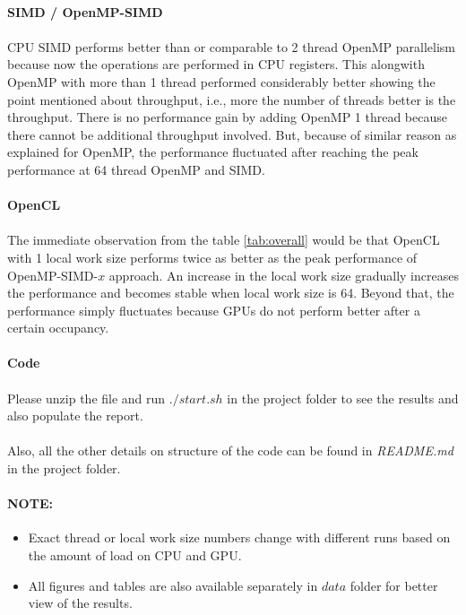 \documentclass[notitlepage]{report}
\begin{document}
	\newpage
	
	\paragraph{SIMD / OpenMP-SIMD}
	\paragraph{} CPU SIMD performs better than or comparable to 2 thread OpenMP parallelism because now the operations are performed in CPU registers. This alongwith OpenMP with more than 1 thread performed considerably better showing the point mentioned about throughput, i.e., more the number of threads better is the throughput. There is no performance gain by adding OpenMP 1 thread because there cannot be additional throughput involved. But, because of similar reason as explained for OpenMP, the performance fluctuated after reaching the peak performance at 64 thread OpenMP and SIMD.
	
	\paragraph{OpenCL}
	\paragraph{} The immediate observation from the table \ref{tab:overall} would be that OpenCL with 1 local work size performs twice as better as the peak performance of OpenMP-SIMD-$x$ approach. An increase in the local work size gradually increases the performance and becomes stable when local work size is 64. Beyond that, the performance simply fluctuates because GPUs do not perform better after a certain occupancy.
	
	\paragraph{Code}
	\paragraph{} Please unzip the file and run $./start.sh$ in the project folder to see the results and also populate the report.
	\paragraph{} Also, all the other details on structure of the code can be found in \textit{README.md} in the project folder.
	
	\paragraph{NOTE:}
	\begin{itemize}
		\item Exact thread or local work size numbers change with different runs based on the amount of load on CPU and GPU.
		\item All figures and tables are also available separately in $data$ folder for better view of the results.
	\end{itemize}
\end{document}
